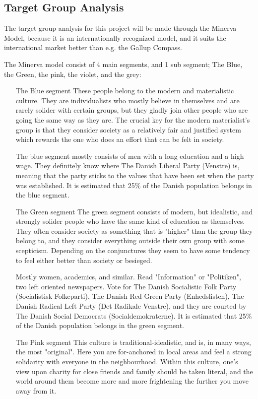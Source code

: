 \subsection{Target Group Analysis}
The target group analysis for this project will be made through the Minerva Model, because it is an internationally recognized model, and it suits the international market better than e.g. the Gallup Compass.

The Minerva model consist of 4 main segments, and 1 sub segment; The Blue, the Green, the pink, the violet, and the grey:
\begin{itemize}
\item[The Blue segment]
These people belong to the modern and materialistic culture. They are individualists who mostly believe in themselves and are rarely solider with certain groups, but they gladly join other people who are going the same way as they are. The crucial key for the modern materialist's group is that they consider society as a relatively fair and justified system which rewards the one who does an effort that can be felt in society.

The blue segment mostly consists of men with a long education and a high wage. They definitely know where The Danish Liberal Party (Venstre) is, meaning that the party sticks to the values that have been set when the party was established. It is estimated that 25\% of the Danish population belongs in the blue segment.

\item[The Green segment]
The green segment consists of modern, but idealistic, and strongly solider people who have the same kind of education as themselves. They often consider society as something that is "higher" than the group they belong to, and they consider everything outside their own group with some scepticism. Depending on the conjunctures they seem to have some tendency to feel either better than society or besieged.

Mostly women, academics, and similar. Read "Information" or "Politiken", two left oriented newspapers. Vote for The Danish Socialistic Folk Party (Socialistisk Folkeparti), The Danish Red-Green Party (Enhedslisten), The Danish Radical Left Party (Det Radikale Venstre), and they are courted by The Danish Social Democrats (Socialdemokraterne).
It is estimated that 25\% of the Danish population belongs in the green segment.

\item[The Pink segment]
This culture is traditional-idealistic, and is, in many ways, the most "original". Here you are for-anchored in local areas and feel a strong solidarity with everyone in the neighbourhood. Within this culture, one's view upon charity for close friends and family should be taken literal, and the world around them become more and more frightening the further you move away from it.


\end{itemize}
